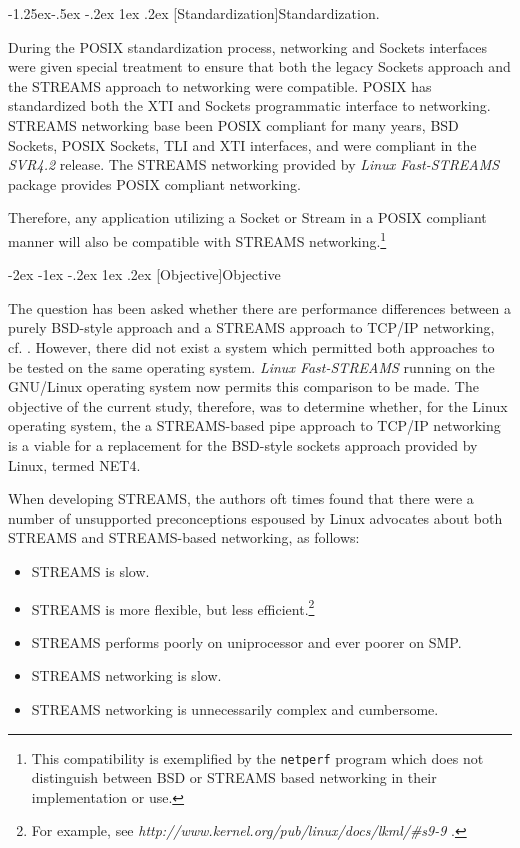 \documentclass[letterpaper,final,notitlepage,twocolumn,10pt,twoside]{article}
\makeatletter
\let\large\normalsize
\let\normalsize\small
\let\small\footnotesize
\let\footnotesize\scriptsize
\let\scriptsize\tiny
\renewcommand\section{\@startsection {section}{1}{\z@}%
                                   {-2ex \@plus -1ex \@minus -.2ex}%
                                   {1ex \@plus .2ex}%
                                   {\normalfont\large\bfseries}}
\renewcommand\subsubsection{\@startsection{subsubsection}{3}{\z@}%
                                     {-1.25ex\@plus -.5ex \@minus -.2ex}%
                                     {1ex \@plus .2ex}%
                                     {\normalfont\normalsize\bfseries}}
\makeatother
\begin{document}
\subsubsection[Standardization]{Standardization.}

During the POSIX standardization process, networking and Sockets interfaces
were given special treatment to ensure that both the legacy Sockets approach
and the STREAMS approach to networking were compatible. POSIX has standardized
both the XTI and Sockets programmatic interface to networking.  STREAMS
networking base been POSIX compliant for many years, BSD Sockets, POSIX
Sockets, TLI and XTI interfaces, and were compliant in the \textsl{SVR4.2}
release.  The STREAMS networking provided by \textsl{Linux Fast-STREAMS}
package provides POSIX compliant networking.

Therefore, any application utilizing a Socket or Stream in a POSIX compliant
manner will also be compatible with STREAMS networking.\footnote{This
compatibility is exemplified by the \texttt{netperf} program which does not
distinguish between BSD or STREAMS based networking in their implementation or
use.}

\section[Objective]{Objective}

The question has been asked whether there are performance differences between
a purely BSD-style approach and a STREAMS approach to TCP/IP networking, cf.
\cite[]{demux}.  However, there did not exist a system which permitted both
approaches to be tested on the same operating system.  \textsl{Linux
Fast-STREAMS} running on the GNU/Linux operating system now permits this
comparison to be made.  The objective of the current study, therefore, was to
determine whether, for the Linux operating system, the a STREAMS-based pipe
approach to TCP/IP networking is a viable for a replacement for the BSD-style
sockets approach provided by Linux, termed NET4.

When developing STREAMS, the authors oft times found that there were a number
of unsupported preconceptions espoused by Linux advocates about both STREAMS
and STREAMS-based networking, as follows:

\begin{itemize}

\item STREAMS is slow.

\item STREAMS is more flexible, but less efficient.\footnote{For example, see
\textit{http://www.kernel.org/pub/linux/docs/lkml/\#s9-9} .}

\item STREAMS performs poorly on uniprocessor and ever poorer on SMP.

\item STREAMS networking is slow.

\item STREAMS networking is unnecessarily complex and cumbersome.

\end{itemize}
\end{document}
